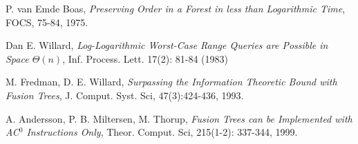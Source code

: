 \documentclass[11pt]{article}
\begin{document}


\begin{thebibliography}{77}

P. van Emde Boas, 
\emph{Preserving Order in a Forest in less than Logarithmic Time},
FOCS, 75-84, 1975.

Dan E. Willard,
\emph{Log-Logarithmic Worst-Case Range Queries are Possible
in Space $\Theta(n)$},
Inf. Process. Lett. 17(2): 81-84 (1983)

M. Fredman, D. E. Willard,
\emph{Surpassing the Information Theoretic Bound with Fusion Trees},
J. Comput. Syst. Sci, 47(3):424-436, 1993. 

A. Andersson, P. B. Miltersen, M. Thorup,
\emph{Fusion Trees can be Implemented with AC$^{\mbox{0}}$ Instructions
  Only},
Theor. Comput. Sci, 215(1-2): 337-344, 1999.




\end{thebibliography}
\end{document}
